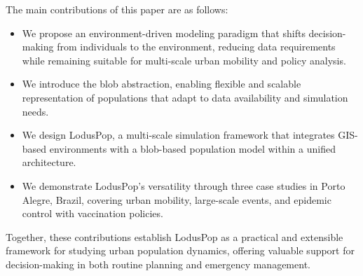 \documentclass[pdflatex,sn-mathphys-num]{sn-jnl}%
\newcommand\redb[1]{#1}
\newcommand\blue[1]{#1}
\theoremstyle{thmstyleone}%
\theoremstyle{thmstyletwo}%
\theoremstyle{thmstylethree}%
\begin{document}
\blue{
The main contributions of this paper are as follows:
\begin{itemize}
    \item We propose an environment-driven modeling paradigm that shifts decision-making from individuals to the environment, \redb{reducing data requirements while remaining suitable for multi-scale urban mobility and policy analysis.}
    \item We introduce the blob abstraction, enabling flexible and scalable representation of populations that adapt to data availability and simulation needs.
    \item \redb{We design LodusPop, a multi-scale simulation framework that integrates GIS-based environments with a blob-based population model within a unified architecture.}%
    \item We demonstrate LodusPop’s versatility through three case studies in Porto Alegre, Brazil, covering urban mobility, large-scale events, and epidemic control with vaccination policies.
\end{itemize}

Together, these contributions establish LodusPop as a practical and extensible framework for studying urban population dynamics, offering valuable support for decision-making in both routine planning and emergency management.}
\end{document}
